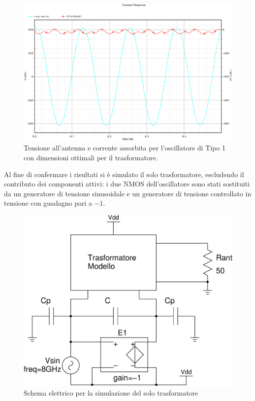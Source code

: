 \documentclass[a4paper, 12pt]{memoir}
\begin{document}
\begin{figure}[h!]
\centering
\includegraphics[width=\textwidth]{images/Vant-It.pdf} 
\caption{Tensione all'antenna e corrente assorbita per l'oscillatore di Tipo 1
      con dimensioni ottimali per il trasformatore.}
\end{figure}

Al fine di confermare i risultati si è simulato il solo trasformatore,
escludendo il contributo dei componenti attivi: i due NMOS dell'oscillatore
sono stati sostituiti da un generatore di tensione sinusoidale e un generatore
di tensione controllato in tensione con guadagno pari a $-1$.

\begin{figure}[h!]
\centering
\includegraphics[height=0.34\textheight]{images/trasf_sim.pdf}
\caption{Schema elettrico per la simulazione del solo trasformatore}
\end{figure}
\clearpage
\end{document}
